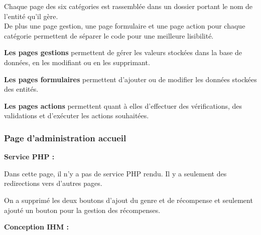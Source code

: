         \begin{paragraphe}
            Chaque page des six catégories est rassemblée dans un dossier portant le nom de l'entité qu'il gère. \\
            De plus une page gestion, une page formulaire et une page action pour chaque catégorie permettent de séparer le code pour une meilleure lisibilité.
        \end{paragraphe}

        \begin{paragraphe}
            \textbf{Les pages gestions} permettent de gérer les valeurs stockées dans la base de données, en les modifiant ou en les supprimant.
        \end{paragraphe}
        
        \begin{paragraphe}
            \textbf{Les pages formulaires} permettent d'ajouter ou de modifier les données stockées des entités.
        \end{paragraphe}
        
        \begin{paragraphe}
            \textbf{Les pages actions} permettent quant à elles d'effectuer des vérifications, des validations et d'exécuter les actions souhaitées.
        \end{paragraphe}

		\subsubsection{Page d'administration accueil}

			\begin{paragraphe}
				\textbf{Service PHP :}
			\end{paragraphe}

			\begin{paragraphe}
				Dans cette page, il n'y a pas de service PHP rendu. Il y a seulement des redirections vers d'autres pages.
			\end{paragraphe}

			\begin{paragraphe}
                On a supprimé les deux boutons d'ajout du genre et de récompense et seulement ajouté un bouton pour la gestion des récompenses.
			\end{paragraphe}
            
			\begin{paragraphe}
				\textbf{Conception IHM :}
			\end{paragraphe}

